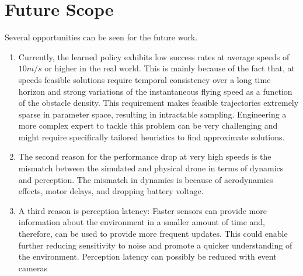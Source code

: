 \section{Future Scope}
Several opportunities can be seen for the future work. 
\begin{enumerate}
	\item Currently, the learned
policy exhibits low success rates at average speeds of $10 m/s$ or
higher in the real world. This is mainly because of the fact that,
at speeds feasible solutions require temporal
consistency over a long time horizon and strong variations of the instantaneous flying speed as a function of the obstacle density. This
requirement makes feasible trajectories extremely sparse in parameter
space, resulting in intractable sampling. Engineering a more complex
expert to tackle this problem can be very challenging and might require
specifically tailored heuristics to find approximate solutions. 
	
	\item The second reason for the performance drop at very
high speeds is the mismatch between the simulated and physical drone
in terms of dynamics and perception. The mismatch in dynamics is
because of aerodynamics effects, motor delays, and dropping battery
voltage.
	
	\item A third reason is
perception latency: Faster sensors can provide more information about
the environment in a smaller amount of time and, therefore, can be
used to provide more frequent updates. This could enable further reducing sensitivity to noise
and promote a quicker understanding of the environment. Perception
latency can possibly be reduced with event cameras
\end{enumerate}